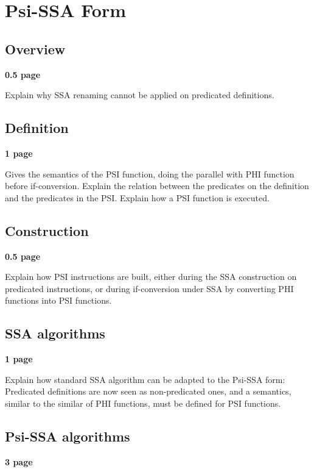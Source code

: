 \chapter{Psi-SSA Form }


\section{Overview}

\textbf{0.5 page}

Explain why SSA renaming cannot be applied on predicated definitions. 

\section{Definition}

\textbf{1 page}

Gives the semantics of the PSI function, doing the parallel with PHI function before if-conversion. Explain the relation between the predicates on the definition and the predicates in the PSI. Explain how a PSI function is executed.

\section{Construction}

\textbf{0.5 page}

Explain how PSI instructions are built, either during the SSA construction on predicated instructions, or during if-conversion under SSA by converting PHI functions into PSI functions.

\section{SSA algorithms}

\textbf{1 page}

Explain how standard SSA algorithm can be adapted to the Psi-SSA form: Predicated definitions are now seen as non-predicated ones, and a semantics, similar to the similar of PHI functions, must be defined for PSI functions.

\section{Psi-SSA algorithms}

\textbf{3 page}

